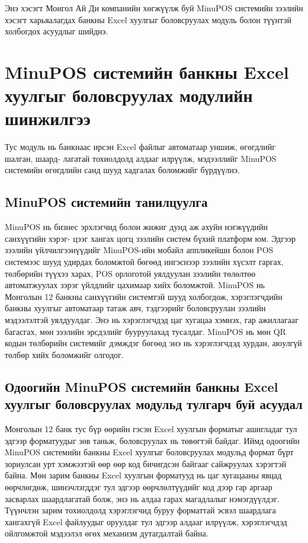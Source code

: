 Энэ хэсэгт Монгол Ай Ди компанийн хөгжүүлж буй MinuPOS системийн зээлийн хэсэгт харьяалагдах банкны Excel хуулгыг боловсруулах модуль болон түүнтэй холбогдох асуудлыг шийднэ.
\section{MinuPOS системийн банкны Excel хуулгыг боловсруулах модулийн шинжилгээ}
Тус модуль нь банкнаас ирсэн Excel файлыг автоматаар уншиж, өгөгдлийг шалган, шаард- лагатай тохиолдолд алдааг илрүүлж, мэдээллийг MinuPOS системийн өгөгдлийн санд шууд хадгалах боломжийг бүрдүүлнэ.
\subsection{MinuPOS системийн танилцуулга}
MinuPOS нь бизнес эрхлэгчид болон жижиг дунд аж ахуйн нэгжүүдийн санхүүгийн хэрэг- цээг хангах цогц зээлийн систем бүхий платформ юм. Эдгээр зээлийн үйлчилгээнүүдийг MinuPOS-ийн мобайл аппликейшн болон POS системээс шууд удирдах боломжтой бөгөөд ингэснээр зээлийн хүсэлт гаргах, төлбөрийн түүхээ харах, POS орлоготой уялдуулан зээлийн төлөлтөө автоматжуулах зэрэг үйлдлийг цахимаар хийх боломжтой. MinuPOS нь Монголын 12 банкны санхүүгийн системтэй шууд холбогдож, хэрэглэгчдийн банкны хуулгыг автоматаар татаж авч, тэдгээрийг боловсруулан зээлийн мэдээлэлтэй уялдуулдаг. Энэ нь хэрэглэгчдэд цаг хугацаа хэмнэх, гар ажиллагааг багасгах, мөн зээлийн эрсдэлийг бууруулахад тусалдаг. MinuPOS нь мөн QR кодын төлбөрийн системийг дэмждэг бөгөөд энэ нь хэрэглэгчдэд хурдан, аюулгүй төлбөр хийх боломжийг олгодог.

\subsection{Одоогийн MinuPOS системийн банкны Excel хуулгыг боловсруулах модульд тулгарч буй асуудал}
Монголын 12 банк тус бүр өөрийн гэсэн Excel хуулгын форматыг ашигладаг тул эдгээр форматуудыг зөв таньж, боловсруулах нь төвөгтэй байдаг. Иймд одоогийн  MinuPOS системийн банкны Excel хуулгыг боловсруулах модульд формат бүрт зориулсан урт хэмжээтэй өөр өөр код бичигдсэн байгааг сайжруулах хэрэгтэй байна. Мөн зарим банкны Excel хуулгын форматууд нь цаг хугацааны явцад өөрчлөгдөж, шинэчлэгддэг тул эдгээр өөрчлөлтүүдийг код дээр гар аргаар засварлах шаардлагатай болж, энэ нь алдаа гарах магадлалыг нэмэгдүүлдэг. Түүнчлэн зарим тохиолдолд хэрэглэгчид буруу форматтай эсвэл шаардлага хангахгүй Excel файлуудыг оруулдаг тул эдгээр алдааг илрүүлж, хэрэглэгчдэд ойлгомжтой мэдээлэл өгөх механизм дутагдалтай байна.

